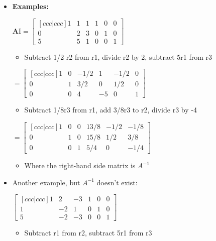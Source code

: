 \begin{itemize}
    \item \textbf{Examples:}

    $
    \bm{A}\text{I} = 
    \begin{bmatrix}[ccc|ccc]
        1 & 1 & 1 & 1 & 0 & 0 \\
        0 & 2 & 3 & 0 & 1 & 0 \\
        5 & 5 & 1 & 0 & 0 & 1
    \end{bmatrix}
    $

    \begin{itemize}
        \item Subtract 1/2 r2 from r1, divide r2 by 2, subtract 5r1 from r3
    \end{itemize}

    $
    = \begin{bmatrix}[ccc|ccc]
        1 & 0 & -1/2 & 1 & - 1/2 & 0 \\
        0 & 1 & 3/2 & 0 & 1/2 & 0 \\
        0 & 0 &  4 & -5 & 0 & 1
    \end{bmatrix}
    $

    \begin{itemize}
        \item Subtract 1/8r3 from r1, add 3/8r3 to r2, divide r3 by -4
    \end{itemize}

    $
    = \begin{bmatrix}[ccc|ccc]
        1 & 0 & 0 & 13/8 & -1/2 & -1/8 \\
        0 & 1 & 0 & 15/8 & 1/2 & 3/8 \\
        0 & 0 & 1 & 5/4 & 0 & -1/4 
    \end{bmatrix}
    $

    \begin{itemize}
        \item Where the right-hand side matrix is $A^{-1}$
    \end{itemize}

    \item Another example, but $A^{-1}$ doesn't exist:

    $\begin{bmatrix}[ccc|ccc]
        1 & 2 & -3 & 1 & 0 & 0 \\
        1 & -2 & 1 & 0 & 1 & 0 \\
        5 & -2 & -3 & 0 & 0 & 1
    \end{bmatrix}$

    \begin{itemize}
        \item Subtract r1 from r2, subtract 5r1 from r3
    \end{itemize}


\end{itemize}
